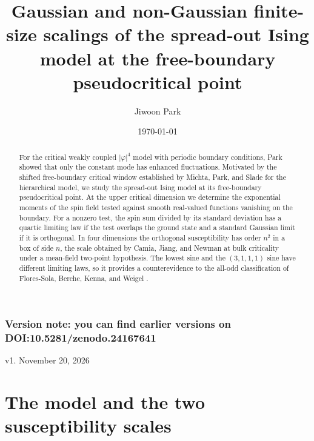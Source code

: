 \documentclass[11pt]{article}
\title{Gaussian and non-Gaussian finite-size scalings of the
spread-out Ising model at the free-boundary pseudocritical point}
\author{Jiwoon Park}
\date{\today}
\numberwithin{equation}{section}
\begin{document}
\maketitle

\begin{abstract}
For the critical weakly coupled $|\varphi|^4$ model with periodic
boundary conditions, Park \cite{park-torus} showed that only the
constant mode has enhanced fluctuations. Motivated by the shifted
free-boundary critical window established by Michta, Park, and Slade
\cite{michta-park-slade} for the hierarchical model, we study the
spread-out Ising model at its free-boundary pseudocritical point.
At the upper critical dimension we determine the exponential moments
of the spin field tested against smooth real-valued functions vanishing
on the boundary. For a nonzero test, the spin sum divided by its
standard deviation has a quartic limiting law if the test overlaps
the ground state and a standard Gaussian limit if it is orthogonal.
In four dimensions the orthogonal susceptibility has order $n^2$
in a box of side $n$, the scale obtained by Camia, Jiang, and Newman
\cite{camia-jiang-newman} at bulk criticality under a mean-field
two-point hypothesis. The lowest sine and the $(3,1,1,1)$ sine have
different limiting laws, so it provides a counterevidence to the all-odd 
classification of Flores-Sola, Berche, Kenna, and Weigel \cite{flores}.
\end{abstract}


\subsubsection*{Version note: you can find earlier versions on DOI:10.5281/zenodo.24167641}

v1. November 20, 2026

\setcounter{tocdepth}{1}
\tableofcontents

\section{The model and the two susceptibility scales}
\end{document}
